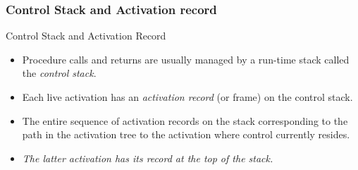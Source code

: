 \begin{bibunit}[apalike]

\subsubsection{Control Stack and Activation record}

\tableofcontentslide[sections={1-4},sectionstyle={show/shaded},subsectionstyle={show/shaded/hide},subsubsectionstyle={show/shaded/hide/hide}]

\begin{frame}{Control Stack and Activation Record}
	\begin{itemize}
	\item Procedure calls and returns are usually managed by a run-time stack called the \emph{control stack}.
	\vfill
	\item Each live activation has an \emph{activation record} (or frame) on the control stack.
	\vfill
	\item The entire sequence of activation records on the stack corresponding to the path in the activation tree to the activation where control currently resides.
	\vfill
	\item \emph{The latter activation has its record at the top of the stack.}
	\end{itemize}
\end{frame}



\end{bibunit}
